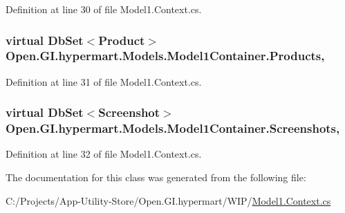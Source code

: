 Definition at line 30 of file Model1.\+Context.\+cs.

\hypertarget{class_open_1_1_g_i_1_1hypermart_1_1_models_1_1_model1_container_a3152c9cb162bad57e707fb1a6b48152c}{}
\subsubsection[{Products}]{\setlength{\rightskip}{0pt plus 5cm}virtual Db\+Set$<${\bf Product}$>$ Open.\+G\+I.\+hypermart.\+Models.\+Model1\+Container.\+Products\hspace{0.3cm}{\ttfamily [get]}, {\ttfamily [set]}}\label{class_open_1_1_g_i_1_1hypermart_1_1_models_1_1_model1_container_a3152c9cb162bad57e707fb1a6b48152c}


Definition at line 31 of file Model1.\+Context.\+cs.

\hypertarget{class_open_1_1_g_i_1_1hypermart_1_1_models_1_1_model1_container_a16840948ed271ebac66728f3398b6696}{}
\subsubsection[{Screenshots}]{\setlength{\rightskip}{0pt plus 5cm}virtual Db\+Set$<${\bf Screenshot}$>$ Open.\+G\+I.\+hypermart.\+Models.\+Model1\+Container.\+Screenshots\hspace{0.3cm}{\ttfamily [get]}, {\ttfamily [set]}}\label{class_open_1_1_g_i_1_1hypermart_1_1_models_1_1_model1_container_a16840948ed271ebac66728f3398b6696}


Definition at line 32 of file Model1.\+Context.\+cs.



The documentation for this class was generated from the following file\+:\begin{DoxyCompactItemize}
\item 
C\+:/\+Projects/\+App-\/\+Utility-\/\+Store/\+Open.\+G\+I.\+hypermart/\+W\+I\+P/\hyperlink{_model1_8_context_8cs}{Model1.\+Context.\+cs}\end{DoxyCompactItemize}
